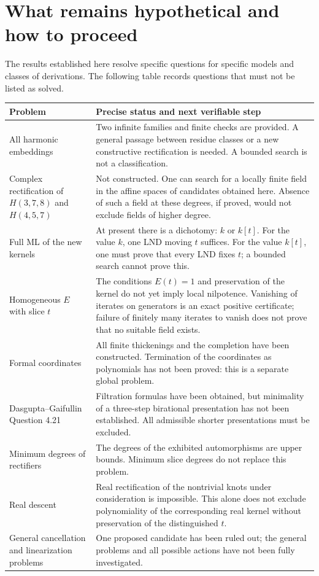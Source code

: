 \section{What remains hypothetical and how to proceed}

The results established here resolve specific questions for specific
models and classes of derivations. The following table records questions
that must not be listed as solved.

\begin{longtable}{L{0.30\textwidth}L{0.64\textwidth}}
\toprule Problem & Precise status and next verifiable step \\ \midrule
\endhead
All harmonic embeddings & Two infinite families and finite checks
are provided. A general passage between residue classes or a new
constructive rectification is needed. A bounded search is not a classification.\\[6pt]
Complex rectification of $H(3,7,8)$ and $H(4,5,7)$ & Not constructed.
One can search for a locally finite field in the affine spaces of
candidates obtained here. Absence of such a field at these degrees, if proved,
would not exclude fields of higher degree.\\[6pt]
Full ML of the new kernels & At present there is a dichotomy: $k$ or $k[t]$.
For the value $k$, one LND moving $t$ suffices.
For the value $k[t]$, one must prove that every LND fixes $t$;
a bounded search cannot prove this.\\[6pt]
Homogeneous $E$ with slice $t$ & The conditions $E(t)=1$ and preservation
of the kernel do not yet imply local nilpotence. Vanishing of iterates
on generators is an exact positive certificate; failure of finitely many
iterates to vanish does not prove that no suitable field exists.\\[6pt]
Formal coordinates & All finite thickenings and the completion have been
constructed. Termination of the coordinates as polynomials has not been
proved: this is a separate global problem.\\[6pt]
Dasgupta--Gaifullin Question 4.21 & Filtration formulas have been obtained,
but minimality of a three-step birational presentation has not
been established. All admissible shorter presentations must be excluded.\\[6pt]
Minimum degrees of rectifiers & The degrees of the exhibited automorphisms
are upper bounds. Minimum slice degrees do not replace this problem.\\[6pt]
Real descent & Real rectification of the nontrivial knots under consideration
is impossible. This alone does not exclude polynomiality of the corresponding
real kernel without preservation of the distinguished $t$.\\[6pt]
General cancellation and linearization problems & One proposed
candidate has been ruled out; the general problems and all possible
actions have not been fully investigated.\\
\bottomrule
\end{longtable}

